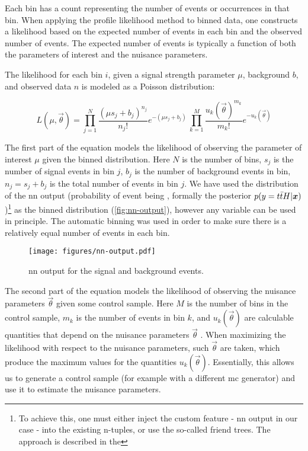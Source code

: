 Each bin has a count representing the number of events or occurrences in that bin. When applying the profile likelihood
method to binned data, one constructs a likelihood based on the expected number of events in each bin and the observed
number of events. The expected number of events is typically a function of both the parameters of interest and the
nuisance parameters.

The likelihood for each bin $i$, given a signal strength parameter $\mu$, background $b$, and observed data $n$
is modeled as a Poisson distribution:

\begin{equation}
    \label{eq:likelihood}
    L(\mu, \vec{\theta}) = \prod_{j=1}^{N} \frac{(\mu s_j + b_j)^{n_j}}{n_j!} e^{-(\mu s_j + b_j)} \,
    \prod_{k=1}^{M} \frac{u_k(\vec{\theta})^{m_k}}{m_k!} e^{-u_k(\vec{\theta})}
\end{equation}

The first part of the equation models the likelihood of observing the parameter of interest $\mu$ given the binned
distribution. Here $N$ is the number of bins, $s_j$ is the number of signal events in bin $j$, $b_j$ is the
number of background events in bin, $n_j = s_j + b_j$ is the total number of events in bin $j$. We have used the
distribution of the \gls{nn} output (probability of event being \tth, formally the posterior
$p(y={t\bar{t}H}|{\boldsymbol{x}})$)\footnote{To achieve this, one must either inject the custom feature - \gls{nn} output in our case
    - into the existing n-tuples, or use the so-called friend trees. The approach is described in the
    } as the binned distribution (\autoref{fig:nn-output}), however any variable can be
used in principle. The automatic binning was used in order to make sure there is a relatively equal number of events
in
each bin.

\begin{figure}[hbt]
    \centering
    \texttt{[image: figures/nn-output.pdf]}
    \caption{\gls{nn} output for the signal and background events.}
    \label{fig:nn-output}
\end{figure}

The second part of the equation models the likelihood of observing the nuisance parameters $\vec{\theta}$ given some
control sample. Here $M$ is the number of bins in the control sample, $m_k$ is the number of events in bin $k$, and
$u_k(\vec{\theta})$ are calculable quantities that depend on the nuisance parameters $\vec{\theta}$ \cite{statistical}.
When maximizing the likelihood with respect to the nuisance parameters, such $\vec{\theta}$ are taken, which produce
the maximum values for the quantities $u_k(\vec{\theta})$. Essentially, this allows us to generate a control sample
(for example with a different \gls{mc} generator) and use it to estimate the nuisance parameters.

